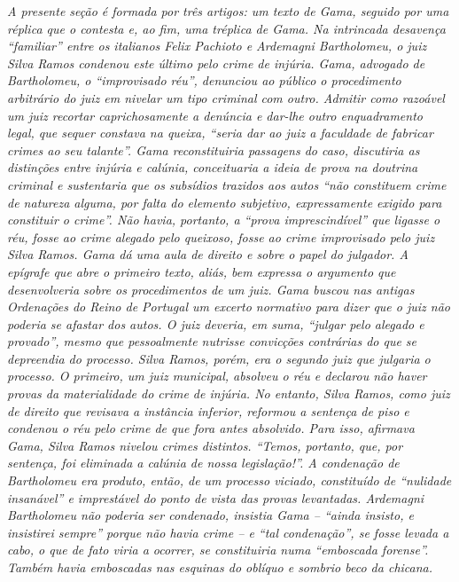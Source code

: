 {\begin{didascalia}
\emph{A presente seção é formada por três artigos: um texto de Gama,
seguido por uma réplica que o contesta e, ao fim, uma tréplica de Gama.
Na intrincada desavença ``familiar'' entre os italianos Felix Pachioto e
Ardemagni Bartholomeu, o juiz Silva Ramos condenou este último pelo
crime de injúria. Gama, advogado de Bartholomeu, o ``improvisado réu'',
denunciou ao público o procedimento arbitrário do juiz em nivelar um
tipo criminal com outro. Admitir como razoável um juiz recortar
caprichosamente a denúncia e dar-lhe outro enquadramento legal, que
sequer constava na queixa, ``seria dar ao juiz a faculdade de fabricar
crimes ao seu talante''. Gama reconstituiria passagens do caso,
discutiria as distinções entre injúria e calúnia, conceituaria a ideia
de prova na doutrina criminal e sustentaria que os subsídios trazidos
aos autos ``não constituem crime de natureza alguma, por falta do
elemento subjetivo, expressamente exigido para constituir o crime''. Não
havia, portanto, a ``prova imprescindível'' que ligasse o réu, fosse ao
crime alegado pelo queixoso, fosse ao crime improvisado pelo juiz Silva
Ramos. Gama dá uma aula de direito e sobre o papel do julgador. A
epígrafe que abre o primeiro texto, aliás, bem expressa o argumento que
desenvolveria sobre os procedimentos de um juiz. Gama buscou nas antigas
Ordenações do Reino de Portugal um excerto normativo para dizer que o
juiz não poderia se afastar dos autos. O juiz deveria, em suma, ``julgar
pelo alegado e provado'', mesmo que pessoalmente nutrisse convicções
contrárias do que se depreendia do processo. Silva Ramos, porém, era o
segundo juiz que julgaria o processo. O primeiro, um juiz municipal,
absolveu o réu e declarou não haver provas da materialidade do crime de
injúria. No entanto, Silva Ramos, como juiz de direito que revisava a
instância inferior, reformou a sentença de piso e condenou o réu pelo
crime de que fora antes absolvido. Para isso, afirmava Gama, Silva Ramos
nivelou crimes distintos. ``Temos, portanto, que, por sentença, foi
eliminada a calúnia de nossa legislação!''. A condenação de Bartholomeu
era produto, então, de um processo viciado, constituído de ``nulidade
insanável'' e imprestável do ponto de vista das provas levantadas.
Ardemagni Bartholomeu não poderia ser condenado, insistia Gama -- ``ainda
insisto, e insistirei sempre'' porque não havia crime -- e ``tal
condenação'', se fosse levada a cabo, o que de fato viria a ocorrer, se
constituiria numa ``emboscada forense''. Também havia emboscadas nas
esquinas do oblíquo e sombrio beco da chicana.}
\end{didascalia}

}
